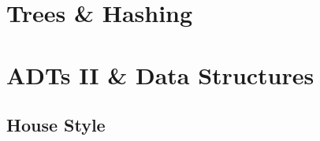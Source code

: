 










\chapter{Trees \& Hashing}










\chapter{ADTs II \& Data Structures }










%

\appendix
\begin{appendices}

\chapter{House Style}
\label{appendix:style}


%

%

\end{appendices}



